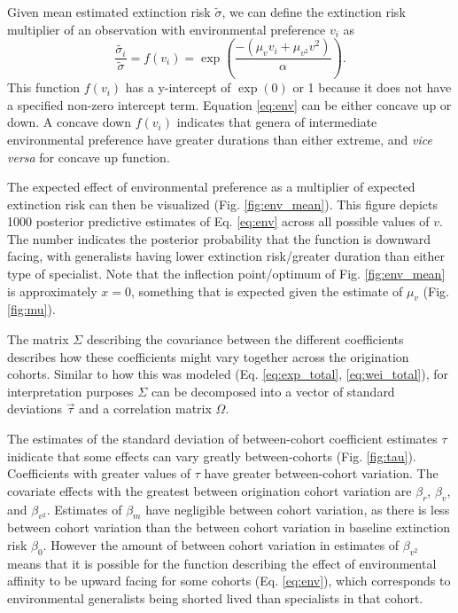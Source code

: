 \documentclass[12pt,letterpaper]{article}
\begin{document}
Given mean estimated extinction risk \(\tilde{\sigma}\), we can define the extinction risk multiplier of an observation with environmental preference \(v_{i}\) as 
\begin{equation}
  \frac{\tilde{\sigma_{i}}}{\tilde{\sigma}} = f(v_{i}) = \exp\left(\frac{-(\mu_{v} v_{i} + \mu_{v^{2}} v^{2})}{\alpha}\right).
  \label{eq:env}
\end{equation}
This function \(f(v_{i})\) has a y-intercept of \(\exp(0)\) or 1 because it does not have a specified non-zero intercept term. Equation \ref{eq:env} can be either concave up or down. A concave down \(f(v_{i})\) indicates that genera of intermediate environmental preference have greater durations than either extreme, and \textit{vice versa} for concave up function.

The expected effect of environmental preference as a multiplier of expected extinction risk can then be visualized (Fig. \ref{fig:env_mean}). This figure depicts 1000 posterior predictive estimates of Eq. \ref{eq:env} across all possible values of \(v\). The number indicates the posterior probability that the function is downward facing, with generalists having lower extinction risk/greater duration than either type of specialist. Note that the inflection point/optimum of Fig. \ref{fig:env_mean} is approximately \(x = 0\), something that is expected given the estimate of \(\mu_{v}\) (Fig. \ref{fig:mu}).

The matrix \(\Sigma\) describing the covariance between the different coefficients describes how these coefficients might vary together across the origination cohorts. Similar to how this was modeled (Eq. \ref{eq:exp_total}, \ref{eq:wei_total}), for interpretation purposes \(\Sigma\) can be decomposed into a vector of standard deviations \(\vec{\tau}\) and a correlation matrix \(\Omega\).

The estimates of the standard deviation of between-cohort coefficient estimates \(\tau\) inidicate that some effects can vary greatly between-cohorts (Fig. \ref{fig:tau}). Coefficients with greater values of \(\tau\) have greater between-cohort variation. The covariate effects with the greatest between origination cohort variation are \(\beta_{r}\), \(\beta_{v}\), and \(\beta_{v^{2}}\). Estimates of \(\beta_{m}\) have negligible between cohort variation, as there is less between cohort variation than the between cohort variation in baseline extinction risk \(\beta_{0}\). However the amount of between cohort variation in estimates of \(\beta_{v^{2}}\) means that it is possible for the function describing the effect of environmental affinity to be upward facing for some cohorts (Eq. \ref{eq:env}), which corresponds to environmental generalists being shorted lived than specialists in that cohort.
\end{document}
